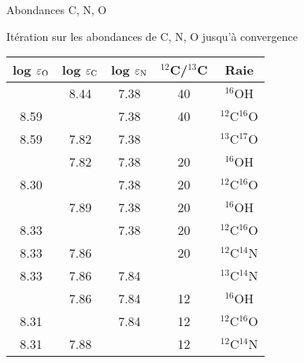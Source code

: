 \documentclass[10pt]{beamer}
\begin{document}
\begin{frame}[fragile]{Abondances C, N, O}

Itération sur les abondances de C, N, O jusqu'à convergence

\begin{table}[h!]
      \vspace{0.3cm}
    \begin{center}
    	\begin{tabular}{ccccc}
            \hline
    		\hline
            log $\varepsilon_{\rm O}$ & log $\varepsilon_{\rm C}$ & log $\varepsilon_{\rm N}$ & $^{12}$C/$^{13}$C & Raie\\
            \hline
            \cellcolor{blue!15}{8.59 $\pm$ 0.01} & 8.44 & 7.38 & 40 & $^{16}$OH \\
        8.59 & \cellcolor{blue!15}{7.82 $\pm$ 0.03} & 7.38 & 40 & $^{12}$C$^{16}$O \\
        8.59 & 7.82 & 7.38 & \cellcolor{blue!15}{20} & $^{13}$C$^{17}$O \\
        \cellcolor{blue!15}{8.30 $\pm$ 0.02} & 7.82 & 7.38 & 20 & $^{16}$OH \\
        8.30 & \cellcolor{blue!15}{7.89 $\pm$ 0.02} & 7.38 & 20 & $^{12}$C$^{16}$O \\
        \cellcolor{blue!15}{8.33 $\pm$ 0.02} & 7.89 & 7.38 & 20 & $^{16}$OH \\
        8.33 & \cellcolor{blue!15}{7.86 $\pm$ 0.03} & 7.38 & 20 & $^{12}$C$^{16}$O \\
        8.33 & 7.86 & \cellcolor{blue!15}{7.84 $\pm$ 0.02} & 20 & $^{12}$C$^{14}$N \\
        8.33 & 7.86 & 7.84 & \cellcolor{blue!15}{12} & $^{13}$C$^{14}$N \\
        \cellcolor{blue!15}{8.31 $\pm$ 0.01} & 7.86 & 7.84 & 12 & $^{16}$OH \\
        8.31 & \cellcolor{blue!15}{7.88 $\pm$ 0.03} & 7.84 & 12 & $^{12}$C$^{16}$O \\
        8.31 & 7.88 & \cellcolor{blue!15}{7.84 $\pm$ 0.02} & 12 & $^{12}$C$^{14}$N \\
        \end{tabular}
    \end{center} 
    \end{table}

\end{frame}
\end{document}
